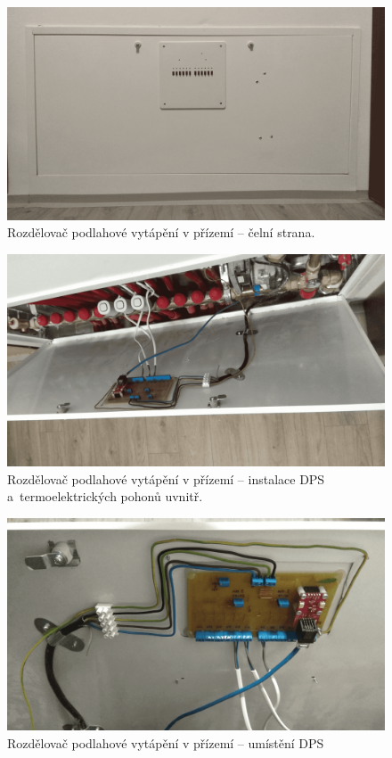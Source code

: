 \begin{figure}[H]
    \centering
    \includegraphics[width=\textwidth]{images/rozdelovac-prizemi/rozdelovac-prizemi-celni-strana.png}
    \caption{Rozdělovač podlahové vytápění v přízemí – čelní strana.}
    \label{fig:rozdelovac-prizemi-celni-strana}
\end{figure}

\begin{figure}[H]
    \centering
    \includegraphics[width=\textwidth]{images/rozdelovac-prizemi/rozdelovac-prizemi.png}
    \caption{Rozdělovač podlahové vytápění v přízemí  – instalace DPS a~termoelektrických pohonů uvnitř.}
    \label{fig:rozdelovac-prizemi}
\end{figure}

\begin{figure}[H]
    \centering
    \includegraphics[width=\textwidth]{images/rozdelovac-prizemi/rozdelovac-prizemi-umisteni-dps.png}
    \caption{Rozdělovač podlahové vytápění v přízemí – umístění DPS}
    \label{fig:rozdelovac-prizemi-umisteni-dps}
\end{figure}